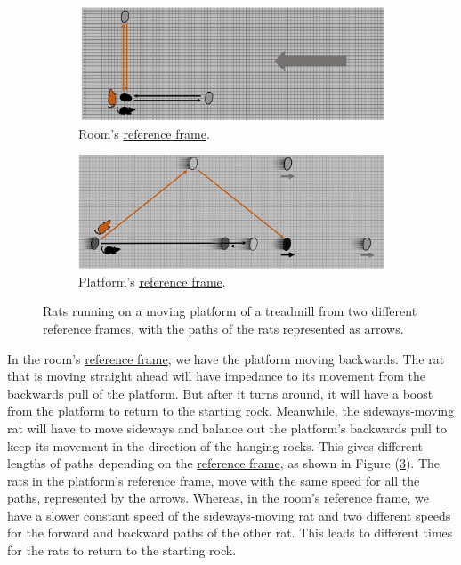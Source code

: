 \begin{figure}[H]
	\centering
	\begin{subfigure}{0.9\textwidth}
		\centering
		\includegraphics[width=\textwidth]{images/pdf/rats_moving.pdf}
		\caption{Room's \protect\hyperlink{def-Reference-frame}{reference frame}.}
		\label{fig: rat with moving platform}
	\end{subfigure}
	\begin{subfigure}{0.9\textwidth}
		\vspace{0.2cm}
		\centering
		\includegraphics[width=\textwidth]{images/pdf/rats_platform_frame.pdf}
		\caption{Platform's \protect\hyperlink{def-Reference-frame}{reference frame}.}
		\label{fig: rat platform reference frame}
	\end{subfigure}
	\caption{Rats running on a moving platform of a treadmill from two different \protect\hyperlink{def-Reference-frame}{reference frame}s, with the paths of the rats represented as arrows.}
	\label{fig: treadmill}
\end{figure}

In the room's \hyperlink{def-Reference-frame}{reference frame}, we have the platform moving backwards.
The rat that is moving straight ahead will have impedance to its movement from the backwards pull of the platform.
But after it turns around, it will have a boost from the platform to return to the starting rock.
Meanwhile, the sideways-moving rat will have to move sideways and balance out the platform's backwards pull to keep its movement in the direction of the hanging rocks.
This gives different lengths of paths depending on the \hyperlink{def-Reference-frame}{reference frame}, as shown in Figure (\ref{fig: treadmill}).
The rats in the platform's reference frame, move with the same speed for all the paths, represented by the arrows.
Whereas, in the room's reference frame, we have a slower constant speed of the sideways-moving rat and two different speeds for the forward and backward paths of the other rat.
This leads to different times for the rats to return to the starting rock.

